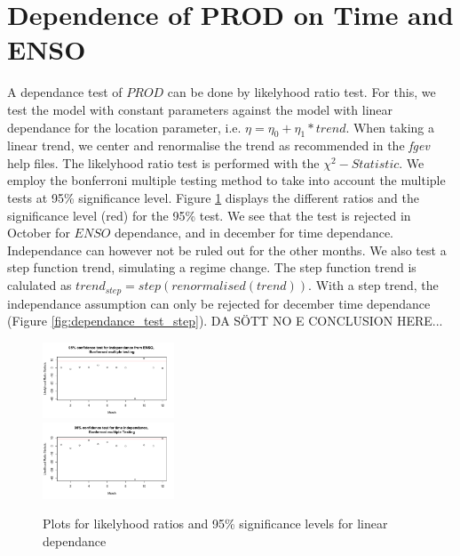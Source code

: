 \documentclass[10pt,conference,compsocconf]{IEEEtran}
\begin{document}
\section*{Dependence of PROD on Time and ENSO}
A dependance test of $PROD$ can be done by likelyhood ratio test. For this, we test the model with constant parameters against the model with linear dependance for the location parameter, i.e. $\eta = \eta_0 + \eta_1*trend$. When taking a linear trend, we center and renormalise the trend  as recommended in the \textit{fgev} help files. The likelyhood ratio test is performed with the $\chi^2-Statistic$. We employ the bonferroni multiple testing method to take into account the multiple tests at 95\% significance level. Figure \ref{fig:dependance_test} displays the different ratios and the significance level (red) for the 95\% test. We see that the test is rejected in October for $ENSO$ dependance, and in december for time dependance. Independance can however not be ruled out for the other months. We also test a step function trend, simulating a regime change. The step function trend is calulated as $trend_{step} = step(renormalised(trend))$. With a step trend, the independance assumption can only be rejected for december time dependance (Figure \ref{fig:dependance_test_step}).
DA SÖTT NO E CONCLUSION HERE...

\begin{figure}
	\centering
	\includegraphics[width=0.35\textwidth]{../plots/enso_dependance.pdf}\\
	\includegraphics[width=0.35\textwidth]{../plots/time_dependance.pdf}
	\caption{Plots for likelyhood ratios and 95\% significance levels for linear dependance}
	\label{fig:dependance_test}
\end{figure}
\end{document}
